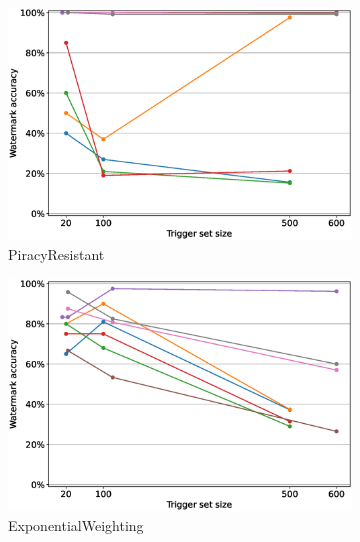 \begin{figure}
\begin{subfigure}{0.41\linewidth}
        \includegraphics[width=\linewidth]{images/finetuning/PiracyResistant_finetuning_per_method_smalllr.eps}
        \caption{PiracyResistant}
        \label{fig:finetuning-smalllr-permethod-piracy}
    \end{subfigure}
    \quad
    \begin{subfigure}{0.41\linewidth}
        \includegraphics[width=\linewidth]{images/finetuning/ExponentialWeighting_finetuning_per_method_smalllr.eps}
        \caption{ExponentialWeighting}
        \label{fig:finetuning-smalllr-permethod-exponential}
    \end{subfigure}
    \quad
    \begin{subfigure}{0.41\linewidth}

\end{subfigure}
\end{figure}
